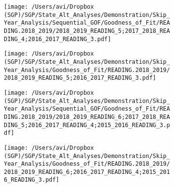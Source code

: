 \documentclass[12pt]{article}
\begin{document}
\begin{figure}[H]
\caption*{{{\bf{Figure A5:}} } Sequential (left) and skip-year (right) fit plots for Reading (grades 5 - 6)}
  \begin{subfigure}[b]{0.5\textwidth}
    \texttt{[image: /Users/avi/Dropbox (SGP)/SGP/State\_Alt\_Analyses/Demonstration/Skip\_Year\_Analysis/Sequential\_GOF/Goodness\_of\_Fit/READING.2018\_2019/2018\_2019\_READING\_5;2017\_2018\_READING\_4;2016\_2017\_READING\_3.pdf]}
  \end{subfigure}
  \begin{subfigure}[b]{0.5\textwidth}
    \texttt{[image: /Users/avi/Dropbox (SGP)/SGP/State\_Alt\_Analyses/Demonstration/Skip\_Year\_Analysis/Goodness\_of\_Fit/READING.2018\_2019/2018\_2019\_READING\_5;2016\_2017\_READING\_3.pdf]}
  \end{subfigure}
  \begin{subfigure}[b]{0.5\textwidth}
    \texttt{[image: /Users/avi/Dropbox (SGP)/SGP/State\_Alt\_Analyses/Demonstration/Skip\_Year\_Analysis/Sequential\_GOF/Goodness\_of\_Fit/READING.2018\_2019/2018\_2019\_READING\_6;2017\_2018\_READING\_5;2016\_2017\_READING\_4;2015\_2016\_READING\_3.pdf]}
  \end{subfigure}
  \begin{subfigure}[b]{0.5\textwidth}
    \texttt{[image: /Users/avi/Dropbox (SGP)/SGP/State\_Alt\_Analyses/Demonstration/Skip\_Year\_Analysis/Goodness\_of\_Fit/READING.2018\_2019/2018\_2019\_READING\_6;2016\_2017\_READING\_4;2015\_2016\_READING\_3.pdf]}
  \end{subfigure}
\end{figure}
\end{document}
